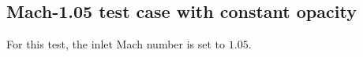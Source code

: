 \documentclass[times,doublespace]{fldauth}%
\begin{document}
\subsection{Mach-1.05 test case with constant opacity}\label{sec:mach-1p05-cst-xs}
%
For this test, the inlet Mach number is set to $1.05$.
\end{document}
